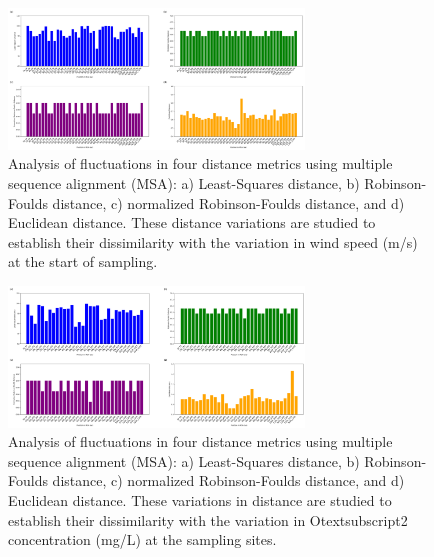 \begin{figure}[]
    \centering
    \includegraphics[width=0.7\textwidth]{figure5.png}
     \caption{Analysis of fluctuations in four distance metrics using multiple sequence alignment (MSA): a) Least-Squares distance, b) Robinson-Foulds distance, c) normalized Robinson-Foulds distance, and d) Euclidean distance. These distance variations are studied to establish their dissimilarity with the variation in wind speed (m/s) at the start of sampling. \label{fig:fig6}}
\end{figure}

\begin{figure}[]
    \centering
    \includegraphics[width=0.7\textwidth]{figure6.png}
    \caption{Analysis of fluctuations in four distance metrics using multiple sequence alignment (MSA): a) Least-Squares distance, b) Robinson-Foulds distance, c) normalized Robinson-Foulds distance, and d) Euclidean distance. These variations in distance are studied to establish their dissimilarity with the variation in Otextsubscript{2} concentration (mg/L) at the sampling sites. \label{fig:fig7}}
\end{figure}

